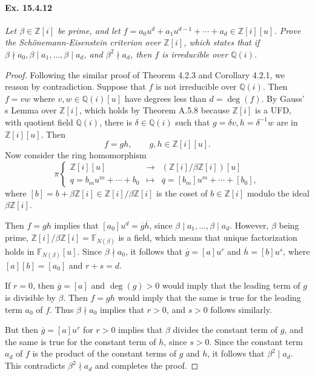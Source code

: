 \documentclass[11pt,a4paper]{article}
\newcommand{\Q}{\mathbb{Q}}
\newcommand{\Z}{\mathbb{Z}}
\newcommand{\F}{\mathbb{F}}
\begin{document}
\paragraph{Ex. 15.4.12}{\it  Let $\beta \in \Z[i]$ be prime, and let $f = a_0u^d+a_1u^{d-1}+\cdots+a_d \in \Z[i][u]$. Prove the Schönemann-Eisenstein criterion over $\Z[i]$, which states that if ${\beta \nmid a_0}, {\beta \mid a_1},\ldots,{\beta \mid a_d}$, and $\beta^2 \nmid a_d$, then $f$ is irreducible over $\Q(i)$.
}

\begin{proof}
Following the similar proof of Theorem 4.2.3 and Corollary 4.2.1, we reason by contradiction. Suppose that $f$ is not irreducible over $\Q(i)$. Then $f = v w$ where $v,w \in \Q(i)[u]$ have degrees less than $d = \deg(f)$. By Gauss' s Lemma over $\Z[i]$, which holds by Theorem A.5.8 because $\Z[i]$ is a UFD, with quotient field $\Q(i)$, there is $\delta \in \Q(i)$ such that $g = \delta v, h = \delta^{-1} w$ are in $\Z[i][u]$. Then
$$f = gh, \qquad g,h \in \Z[i][u].$$ 
Now consider the ring homomorphism
$$
\pi 
\left\{
\begin{array}{ccl}
\Z[i][u] & \to & \left(\Z[i]/\beta \Z[i]\right)[u]\\
q = b_m u^m+\cdots + b_0 & \mapsto &\overline{q} = [b_m] u^m + \cdots + [b_0],
\end{array}
\right.
$$
where $[b] = b + \beta \Z[i] \in  \Z[i]/\beta \Z[i]$ is the coset of $b \in \Z[i]$ modulo the ideal $\beta \Z[i]$.

Then $f = gh$ implies that $[a_0]u^d = \overline{g} \overline{h}$, since $\beta \mid a_{1}, \ldots, \beta \mid a_d$. However, $\beta$ being prime, $\Z[i]/\beta \Z[i] = \F_{N(\beta)}$ is a field, which means that unique factorization holds in $\F_{N(\beta)}[u]$. Since $\beta \nmid a_0$, it follows that $\overline{g} = [a] u^r$ and $\overline{h} = [b] u^s$, where $[a][b] = [a_0]$ and $r+s = d$.

If $r = 0$, then $\overline{g} = [a]$ and $\deg(g)>0$ would imply that the leading term of $g$ is divisible by $\beta$. Then $f = gh$ would imply that the same is true for the leading term $a_0$ of $f$. Thus $\beta \nmid a_0$ implies that $r>0$, and $s>0$ follows similarly.

But then $\overline{g} = [a]u^r$ for $r>0$ implies that $\beta$ divides the constant term of $g$, and the same is true for the constant term of $h$, since $s>0$. Since the constant term $a_d$ of $f$ is the product of the constant terms of $g$ and $h$, it follows that $\beta^2 \mid a_d$. This contradicts $\beta^2 \nmid a_d$ and completes the proof.
\end{proof}
\end{document}
